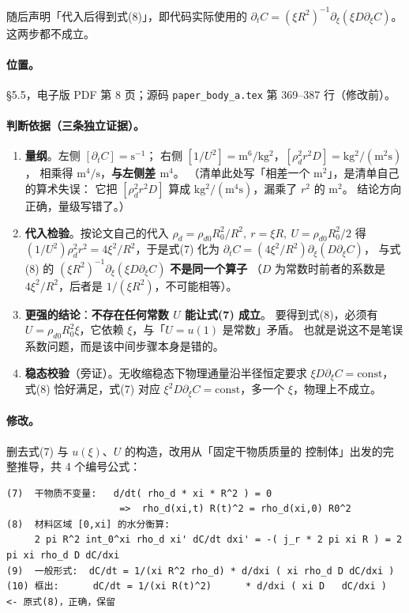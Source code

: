 \documentclass[11pt,a4paper]{ctexart}
\newcommand{\src}[1]{\texttt{#1}}
\newcommand{\loc}[1]{\textcolor{blue!60!black}{#1}}
\begin{document}
\noindent 随后声明「代入后得到式(8)」，即代码实际使用的
$\partial_t C=(\xi R^2)^{-1}\partial_\xi(\xi D\partial_\xi C)$。这两步都不成立。

\paragraph{位置。}\loc{§5.5，电子版 PDF 第 8 页；源码 \src{paper\_body\_a.tex} 第 369--387 行（修改前）}。

\paragraph{判断依据（三条独立证据）。}
\begin{enumerate}[leftmargin=2.2em,itemsep=2pt]
  \item \textbf{量纲}。左侧 $[\partial_tC]=\mathrm{s^{-1}}$；
  右侧 $[1/U^2]=\mathrm{m^6/kg^2}$，$[\rho_d^2r^2D]=\mathrm{kg^2/(m^2s)}$，
  相乘得 $\mathrm{m^4/s}$，\textbf{与左侧差 $\mathrm{m^4}$}。
  （清单此处写「相差一个 $\mathrm{m^2}$」，是清单自己的算术失误：
  它把 $[\rho_d^2r^2D]$ 算成 $\mathrm{kg^2/(m^4s)}$，漏乘了 $r^2$ 的 $\mathrm{m^2}$。
  结论方向正确，量级写错了。）
  \item \textbf{代入检验}。按论文自己的代入
  $\rho_d=\rho_{d0}R_0^2/R^2,\ r=\xi R,\ U=\rho_{d0}R_0^2/2$ 得
  $(1/U^2)\rho_d^2r^2=4\xi^2/R^2$，于是式(7) 化为
  $\partial_tC=(4\xi^2/R^2)\partial_\xi(D\partial_\xi C)$，
  与式(8) 的 $(\xi R^2)^{-1}\partial_\xi(\xi D\partial_\xi C)$ \textbf{不是同一个算子}
  （$D$ 为常数时前者的系数是 $4\xi^2/R^2$，后者是 $1/(\xi R^2)$，不可能相等）。
  \item \textbf{更强的结论}：\textbf{不存在任何常数 $U$ 能让式(7) 成立}。
  要得到式(8)，必须有 $U=\rho_{d0}R_0^2\xi$，它依赖 $\xi$，与「$U=u(1)$ 是常数」矛盾。
  也就是说这不是笔误系数问题，而是该中间步骤本身是错的。
  \item \textbf{稳态校验}（旁证）。无收缩稳态下物理通量沿半径恒定要求
  $\xi D\partial_\xi C=\text{const}$，式(8) 恰好满足，式(7) 对应
  $\xi^2D\partial_\xi C=\text{const}$，多一个 $\xi$，物理上不成立。
\end{enumerate}

\paragraph{修改。}删去式(7) 与 $u(\xi)$、$U$ 的构造，改用从「固定干物质质量的
控制体」出发的完整推导，共 4 个编号公式：

\begin{lstlisting}[style=new]
(7)  干物质不变量:   d/dt( rho_d * xi * R^2 ) = 0
                    =>  rho_d(xi,t) R(t)^2 = rho_d(xi,0) R0^2
(8)  材料区域 [0,xi] 的水分衡算:
     2 pi R^2 int_0^xi rho_d xi' dC/dt dxi' = -( j_r * 2 pi xi R ) = 2 pi xi rho_d D dC/dxi
(9)  一般形式:  dC/dt = 1/(xi R^2 rho_d) * d/dxi ( xi rho_d D dC/dxi )
(10) 框出:      dC/dt = 1/(xi R(t)^2)      * d/dxi ( xi D   dC/dxi )   <- 原式(8)，正确，保留
\end{lstlisting}
\end{document}

